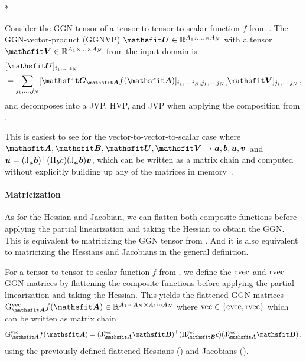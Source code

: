 \switchcolumn[1]*
\switchcolumn[0]

\begin{definition}\label{def:ggnvp}%
  Consider the GGN tensor of a tensor-to-tensor-to-scalar function $f$ from .
  The GGN-vector-product (GGNVP) $\tU \in \sR^{A_1 \times \ldots \times A_N}$ with a tensor $\tV \in \sR^{A_1 \times \ldots \times A_N}$ from the input domain is
  \begin{align*}
     & [\tU]_{i_1, \dots, i_N}
    \\
     & =
    \sum_{j_1, \dots, j_N}
    [\tG_{\tA} f(\tA)]_{i_1, \dots, i_N, j_1, \dots, j_N}
    [\tV]_{j_1, \dots, j_N}\,,
  \end{align*}
  and decomposes into a JVP, HVP, and JVP when applying the composition from .
\end{definition}
This is easiest to see for the vector-to-vector-to-scalar case where $\tA, \tB, \tU, \tV \to \va, \vb, \vu, \vv$ and ${\bm{u}} = (\mathrm{J}_{{\bm{a}}}{\bm{b}})^{\top} (\mathrm{H}_{{\bm{b}}} c) (\mathrm{J}_{{\bm{a}}} {\bm{b}}) {\bm{v}}$, which can be written as a matrix chain and computed without explicitly building up any of the matrices in memory~\cite{schraudolph2002fast}.

\paragraph{Matricization} As for the Hessian and Jacobian, we can flatten both composite functions before applying the partial linearization and taking the Hessian to obtain the GGN.
This is equivalent to matricizing the GGN tensor from .
And it is also equivalent to matricizing the Hessians and Jacobians in the general definition.

\begin{definition}\label{def:vec_ggns}
  For a tensor-to-tensor-to-scalar function $f$ from , we define the $\operatorname{cvec}$ and $\operatorname{rvec}$ GGN matrices by flattening the composite functions before applying the partial linearization and taking the Hessian. This yields the flattened GGN matrices $\ggn^{\vec}_{\tA}f(\tA) \in \sR^{A_1 \cdots A_N \times A_1 \cdots A_N}$ where $\operatorname{vec} \in \{\operatorname{cvec}, \operatorname{rvec}\}$ which can be written as matrix chain
  \begin{align*}
    \ggn^{\vec}_{\tA} f(\tA)
    =
    (\jac^{\vec}_{\tA} \tB)^{\top}
    (\hess^{\vec}_{\tB} c)
    (\jac^{\vec}_{\tA} \tB)\,.
  \end{align*}
  using the previously defined flattened Hessians () and Jacobians ().
\end{definition}

